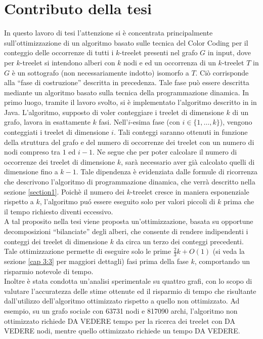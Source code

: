 \section{Contributo della tesi}

In questo lavoro di tesi l'attenzione si è concentrata principalmente sull'ottimizzazione di un algoritmo basato sulle tecnica del Color Coding per il conteggio delle occorrenze di tutti i $k$-treelet presenti nel grafo $G$ in input, dove per $k$-treelet  si intendono alberi con $ k $ nodi e ed un occorrenza di un $k$-treelet $T$ in $G$ è un sottografo (non necessariamente indotto) isomorfo a $T$.
Ci\`o corrisponde alla ``fase di costruzione'' descritta in precedenza. Tale fase pu\`o essere descritta mediante un algoritmo basato sulla tecnica della programmazione dinamica.
In primo luogo, tramite il lavoro svolto, si \`e implementato l'algoritmo descritto in  \cite{bressan2018motif} in Java.
L'algoritmo, supposto di voler conteggiare i treelet di dimensione $ k $ di un grafo, lavora in esattamente  $k$ fasi.
Nell'$i$-esima fase (con $i \in \{1, \dots, k\}$), vengono conteggiati i treelet di dimensione $i$.
Tali conteggi saranno ottenuti in funzione della struttura del grafo e del numero di occorrenze dei treelet con un numero di nodi compreso tra $1$ ed $i-1$.
Ne segue che per poter calcolare il numero di occorrenze dei treelet di dimensione $ k $, sar\`a necessario aver gi\`a calcolato quelli di dimensione fino a $ k-1$.
Tale dipendenza \`e evidenziata dalle formule di ricorrenza che descrivono l'algoritmo di programmazione dinamica, che verr\`a descritto nella sezione \ref{section1}.
Poich\`e il numero dei $ k $-treelet cresce in maniera esponenziale rispetto a $ k $, l'algoritmo pu\'o essere eseguito solo per valori piccoli di $ k $ prima che il tempo richiesto diventi eccessivo.\\
A tal proposito nella tesi viene proposta un'ottimizzazione, basata su opportune decomposizioni ``bilanciate'' degli alberi, che consente di rendere indipendenti i conteggi dei treelet di dimensione $ k $ da circa un terzo dei conteggi precedenti.
Tale ottimizzazione permette di eseguire solo le prime $\frac{2}{3} k + O(1)$ (si veda la sezione \ref{cap 3:3} per maggiori dettagli) fasi prima della fase $ k $, comportando un risparmio notevole di tempo.\\
Inoltre è stata condotta un'analisi sperimentale su quattro grafi, con lo scopo di valutare l'accuratezza delle stime ottenute ed  il risparmio di tempo che risultante dall'utilizzo dell'algoritmo ottimizzato rispetto a quello non ottimizzato.
Ad esempio, su un grafo sociale con 63731 nodi e 817090 archi, l'algoritmo non ottimizzato richiede DA VEDERE tempo per la ricerca dei treelet con DA VEDERE nodi, mentre quello ottimizzato richiede un tempo DA VEDERE.


